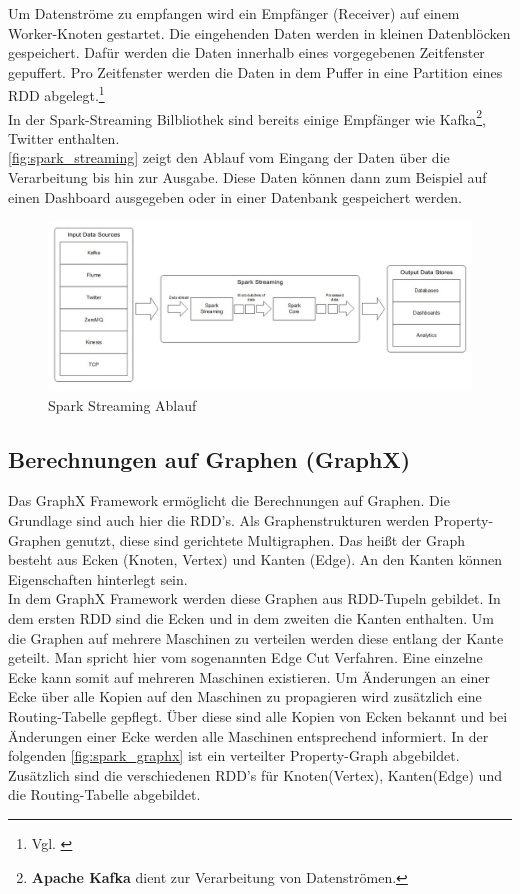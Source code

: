 \noindent
Um Datenströme zu empfangen wird ein Empfänger (Receiver) auf einem Worker-Knoten gestartet. Die eingehenden Daten werden in kleinen Datenblöcken gespeichert. Dafür werden die Daten innerhalb eines vorgegebenen Zeitfenster gepuffert. Pro Zeitfenster werden die Daten in dem Puffer in eine Partition eines RDD abgelegt.\footnote{Vgl. \cite{BDS16}} \\

\noindent
In der Spark-Streaming Bilbliothek sind bereits einige Empfänger wie Kafka\footnote{\textbf{Apache Kafka} dient zur Verarbeitung von Datenströmen.}, Twitter enthalten. \\
\autoref{fig:spark_streaming} zeigt den Ablauf vom Eingang der Daten über die Verarbeitung bis hin zur Ausgabe. Diese Daten können dann zum Beispiel auf einen Dashboard ausgegeben oder in einer Datenbank gespeichert werden.

\begin{figure}[h]
  \centering
  \includegraphics[width=\textwidth]{./bilder/spark_streaming.jpg}
  \caption{Spark Streaming Ablauf \cite{INFOQ_STREAMING}}\label{fig:spark_streaming}
\end{figure}





\newpage
\subsection{Berechnungen auf Graphen (GraphX)}

Das GraphX Framework ermöglicht die Berechnungen auf Graphen. Die Grundlage sind auch hier die RDD's. Als Graphenstrukturen werden Property-Graphen genutzt,
diese sind gerichtete Multigraphen. Das heißt der Graph besteht aus Ecken (Knoten, Vertex) und Kanten (Edge). An den Kanten können Eigenschaften hinterlegt sein.\\

\noindent
In dem GraphX Framework werden diese Graphen aus RDD-Tupeln gebildet. In dem ersten RDD sind die Ecken und in dem zweiten die Kanten enthalten. Um die Graphen auf mehrere Maschinen zu verteilen werden diese entlang der Kante geteilt. Man spricht hier vom sogenannten Edge Cut Verfahren. Eine einzelne Ecke kann somit auf mehreren Maschinen existieren. Um Änderungen an einer Ecke über alle Kopien auf den Maschinen zu propagieren wird zusätzlich eine Routing-Tabelle gepflegt. Über diese sind alle Kopien von Ecken bekannt und bei Änderungen einer Ecke werden alle Maschinen entsprechend informiert. 
In der folgenden \autoref{fig:spark_graphx} ist ein verteilter Property-Graph abgebildet. Zusätzlich sind die verschiedenen RDD's für Knoten(Vertex), Kanten(Edge) und die Routing-Tabelle abgebildet.

